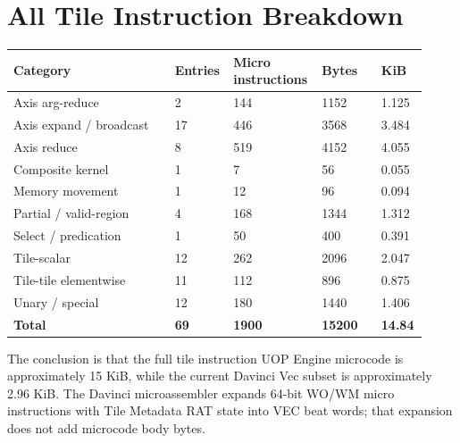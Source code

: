 \section{All Tile Instruction Breakdown}
\begin{longtable}{@{}L{0.38\linewidth}R{0.12\linewidth}R{0.18\linewidth}R{0.14\linewidth}R{0.10\linewidth}@{}}
\toprule
Category & Entries & Micro instructions & Bytes & KiB \\
\midrule
Axis arg-reduce & 2 & 144 & 1152 & 1.125 \\
Axis expand / broadcast & 17 & 446 & 3568 & 3.484 \\
Axis reduce & 8 & 519 & 4152 & 4.055 \\
Composite kernel & 1 & 7 & 56 & 0.055 \\
Memory movement & 1 & 12 & 96 & 0.094 \\
Partial / valid-region & 4 & 168 & 1344 & 1.312 \\
Select / predication & 1 & 50 & 400 & 0.391 \\
Tile-scalar & 12 & 262 & 2096 & 2.047 \\
Tile-tile elementwise & 11 & 112 & 896 & 0.875 \\
Unary / special & 12 & 180 & 1440 & 1.406 \\
\midrule
\textbf{Total} & \textbf{69} & \textbf{1900} & \textbf{15200} & \textbf{14.84} \\
\bottomrule
\end{longtable}

The conclusion is that the full tile instruction UOP Engine microcode is approximately 15 KiB, while the current Davinci Vec subset is approximately 2.96 KiB. The Davinci microassembler expands 64-bit WO/WM micro instructions with Tile Metadata RAT state into VEC beat words; that expansion does not add microcode body bytes.
